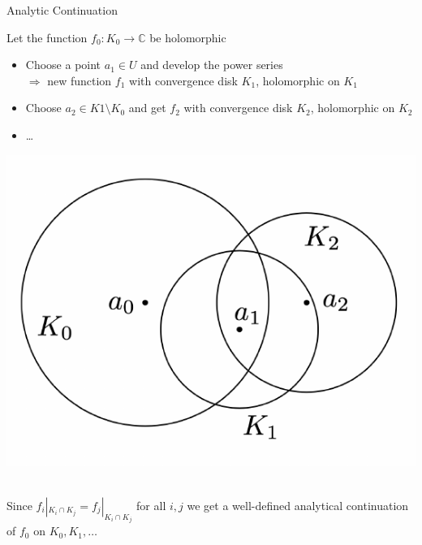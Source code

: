 \documentclass[10pt, dvipsnames]{beamer}
\begin{document}
	\begin{frame}{Analytic Continuation}
		\begin{myr}\centering
			Let the function \( f_0:K_0 \to \mathbb{C} \) be holomorphic
		\end{myr}
		\begin{itemize}
			\item Choose a point \( a_1 \in U \) and develop the power series \\
			\( \Rightarrow \) new function \( f_1 \) with convergence disk \( K_1 \), holomorphic on \( K_1 \)
			\item Choose \( a_2 \in K1\setminus K_0 \) and get \( f_2 \) with convergence disk \( K_2 \), holomorphic on \( K_2 \)
			\item \dots
		\end{itemize}
        \centering 
	    \begin{minipage}{0.6\textwidth}
	    	\hspace{1cm}
	    	\includegraphics[scale=0.4]{cont}
	    \end{minipage}
        \\[0.2cm]
		Since \( f_i|_{K_i\cap K_j} = f_j|_{K_i\cap K_j} \) for all \( i, j \) we get a well-defined analytical continuation of \( f_0 \) on \( K_0, K_1, \dots \)
	\end{frame}
\end{document}
